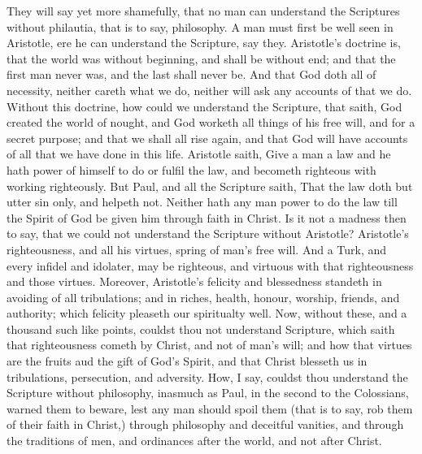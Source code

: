 They will say yet more shamefully, that no 
man can understand the Scriptures without philautia,
that is to say, philosophy. A man must 
first be well seen in Aristotle, ere he can understand
the Scripture, say they. Aristotle's doctrine
is, that the world was without beginning, 
and shall be without end; and that the first man 
never was, and the last shall never be. And 
that God doth all of necessity, neither careth 
what we do, neither will ask any accounts of 
that we do. Without this doctrine, how could 
we understand the Scripture, that saith, God 
created the world of nought, and God worketh 
all things of his free will, and for a secret purpose;
and that we shall all rise again, and that 
God will have accounts of all that we have done 
in this life. Aristotle saith, Give a man a law
and he hath power of himself to do or fulfil the 
law, and becometh righteous with working 
righteously. But Paul, and all the Scripture
saith, That the law doth but utter sin only, 
and helpeth not. Neither hath any man power 
to do the law till the Spirit of God be given him 
through faith in Christ. Is it not a madness then 
to say, that we could not understand the Scripture
without Aristotle? Aristotle's righteousness,
and all his virtues, spring of man's free 
will. And a Turk, and every infidel and idolater,
may be righteous, and virtuous with that 
righteousness and those virtues. Moreover, 
Aristotle's felicity and blessedness standeth in 
avoiding of all tribulations; and in riches, health, 
honour, worship, friends, and authority; which 
felicity pleaseth our spiritualty well. Now, 
without these, and a thousand such like points, 
couldst thou not understand Scripture, which
saith that righteousness cometh by Christ, and 
not of man's will; and how that virtues are the 
fruits aud the gift of God's Spirit, and that Christ 
blesseth us in tribulations, persecution, and adversity.
How, I say, couldst thou understand 
the Scripture without philosophy, inasmuch as 
Paul, in the second to the Colossians, warned 
them to beware, lest any man should spoil them 
(that is to say, rob them of their faith in Christ,) 
through philosophy and deceitful vanities, and 
through the traditions of men, and ordinances 
after the world, and not after Christ. 

